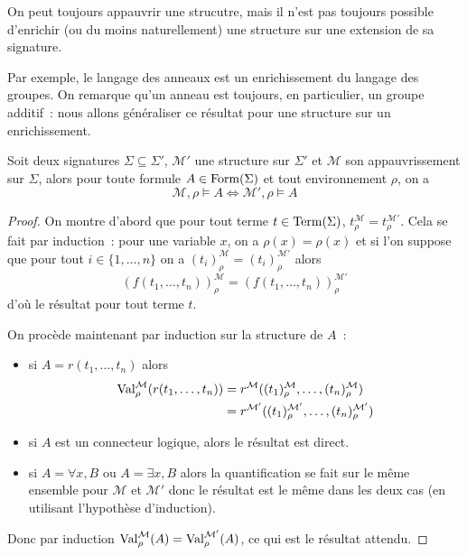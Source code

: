 \begin{remark}
  On peut toujours appauvrir une strucutre, mais il n'est pas toujours possible
  d'enrichir (ou du moins naturellement) une structure sur une extension de sa
  signature.
\end{remark}

Par exemple, le langage des anneaux est un enrichissement du langage des
groupes. On remarque qu'un anneau est toujours, en particulier, un groupe
additif~: nous allons généraliser ce résultat pour une structure sur un
enrichissement.

\begin{proposition}
  Soit deux signatures $\Sigma\subseteq\Sigma'$, $\mathcal M'$ une structure
  sur $\Sigma'$ et $\mathcal M$ son appauvrissement sur $\Sigma$, alors pour
  toute formule $A\in\operatorname{Form}(\Sigma)$ et tout environnement $\rho$, on a
  \[\mathcal M,\rho\models A \iff \mathcal M',\rho\models A\]
\end{proposition}

\begin{proof}
  On montre d'abord que pour tout terme $t\in\operatorname{Term}(\Sigma)$,
  $t_\rho^\mathcal M = t_\rho^{\mathcal M'}$. Cela se fait par induction~: pour une
  variable $x$, on a $\rho(x) = \rho(x)$ et si l'on suppose que pour tout
  $i\in\{1,\ldots,n\}$ on a $(t_i)_\rho^\mathcal M = (t_i)_\rho^{\mathcal M'}$ alors
  \[(f(t_1,\ldots,t_n))_\rho^\mathcal M = (f(t_1,\ldots,t_n))_\rho^{\mathcal M'}\]
  d'où le résultat pour tout terme $t$.
  
  On procède maintenant par induction sur la structure de $A$~:
  \begin{itemize}
  \item si $A = r(t_1,\ldots,t_n)$ alors
    \begin{align*}
      \operatorname{Val}_\rho^\mathcal M(r(t_1,\ldots,t_n)) &= r^\mathcal M((t_1)_\rho^\mathcal M,
      \ldots,(t_n)_\rho^\mathcal M) \\
      &= r^{\mathcal M'}((t_1)_\rho^{\mathcal M'},\ldots,(t_n)_{\rho}^{\mathcal M'})
    \end{align*}
  \item si $A$ est un connecteur logique, alors le résultat est direct.
  \item si $A = \forall x, B$ ou $A = \exists x, B$ alors la quantification se
    fait sur le même ensemble pour $\mathcal M$ et $\mathcal M'$ donc le
    résultat est le même dans les deux cas (en utilisant l'hypothèse
    d'induction).
  \end{itemize}
  Donc par induction $\operatorname{Val}_\rho^\mathcal M(A) = \operatorname{Val}_\rho^{\mathcal M'}(A)$,
  ce qui est le résultat attendu.
\end{proof}

